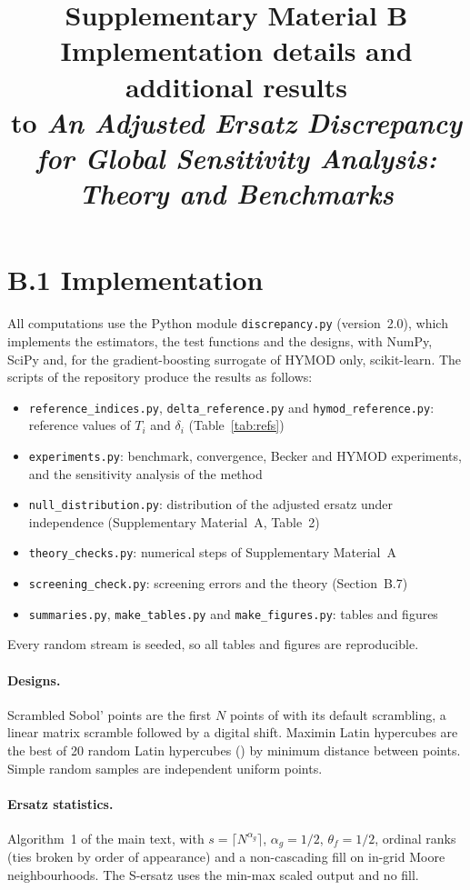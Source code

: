 \documentclass[11pt,a4paper]{article}
\title{\large\bfseries Supplementary Material B\\[3pt]\normalsize Implementation details and additional results\\[3pt]
\normalsize to \emph{An Adjusted Ersatz Discrepancy for Global Sensitivity Analysis: Theory and Benchmarks}}
\author{}\date{}
\begin{document}
\maketitle

\section*{B.1 Implementation}

All computations use the Python module \texttt{discrepancy.py} (version~2.0), which implements the estimators, the test functions and the designs, with NumPy, SciPy and, for the gradient-boosting surrogate of HYMOD only, scikit-learn. The scripts of the repository produce the results as follows:
\begin{itemize}\setlength{\itemsep}{0pt}
\item \texttt{reference\_indices.py}, \texttt{delta\_reference.py} and \texttt{hymod\_reference.py}: reference values of $T_i$ and $\delta_i$ (Table~\ref{tab:refs})
\item \texttt{experiments.py}: benchmark, convergence, Becker and HYMOD experiments, and the sensitivity analysis of the method
\item \texttt{null\_distribution.py}: distribution of the adjusted ersatz under independence (Supplementary Material~A, Table~2)
\item \texttt{theory\_checks.py}: numerical steps of Supplementary Material~A
\item \texttt{screening\_check.py}: screening errors and the theory (Section~B.7)
\item \texttt{summaries.py}, \texttt{make\_tables.py} and \texttt{make\_figures.py}: tables and figures
\end{itemize}
Every random stream is seeded, so all tables and figures are reproducible.

\paragraph{Designs.} Scrambled Sobol' points are the first $N$ points of  with its default scrambling, a linear matrix scramble followed by a digital shift. Maximin Latin hypercubes are the best of 20 random Latin hypercubes () by minimum distance between points. Simple random samples are independent uniform points.

\paragraph{Ersatz statistics.} Algorithm~1 of the main text, with $s=\lceil N^{\alpha_g}\rceil$, $\alpha_g=1/2$, $\theta_f=1/2$, ordinal ranks (ties broken by order of appearance) and a non-cascading fill on in-grid Moore neighbourhoods. The S-ersatz uses the min-max scaled output and no fill.
\end{document}
